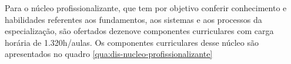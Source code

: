 \begin{quadro}[!h]	
\centering
{}		
\end{quadro}

Para o núcleo profissionalizante, que tem por objetivo conferir conhecimento e habilidades referentes aos fundamentos, aos sistemas e aos processos da especialização, são ofertados dezenove componentes curriculares com carga horária de 1.320h/aulas. Os componentes curriculares desse núcleo são apresentados no quadro \ref{qua:dis-nucleo-profissionalizante}\\

